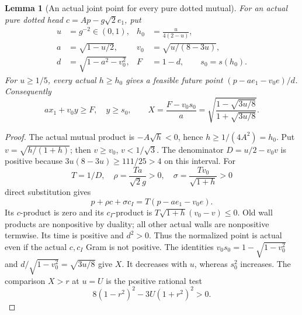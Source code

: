 \documentclass[11pt]{article}
\newtheorem{lemma}[theorem]{Lemma}
\theoremstyle{definition}
\theoremstyle{remark}
\begin{document}
\begin{lemma}[An actual joint point for every pure dotted mutual]
\label{lem:I-pure-dotted-joint-point}
For an actual pure dotted head \(c=Ap-g\sqrt2e_1\), put
\[
\begin{aligned}
 u&=g^{-2}\in(0,1),& h_0&=\frac{u}{4(2-u)},\\
 a&=\sqrt{1-u/2},& v_0&=\sqrt{u/(8-3u)},\\
 d&=\sqrt{1-a^2-v_0^2},& F&=1-d,\qquad s_0=s(h_0).
\end{aligned}
\]
For \(u\ge1/5\), every actual \(h\ge h_0\) gives a feasible
future point \((p-ae_1-v_0e)/d\). Consequently
\[
 a x_1+v_0y\ge F,\quad y\ge s_0,\qquad
 X={\frac{F-v_0s_0}{ a}}
 =\sqrt{{\frac{1-\sqrt{3u/8}}{1+\sqrt{3u/8}}}}.
\]
\end{lemma}
\begin{proof}
The actual mutual product is \(-A\sqrt h<0\), hence
\(h\ge1/(4A^2)=h_0\). Put \(v=\sqrt{h/(1+h)}\);
then \(v\ge v_0\), \(v<1/\sqrt3\).
The denominator \(D=u/2-v_0v\) is positive because
\(3u(8-3u)\ge111/25>4\) on this interval. For
\[
 T=1/D,\quad \rho={\frac{Ta}{\sqrt2g}}>0,\quad
 \sigma={\frac{Tv_0}{\sqrt{1+h}}}>0
\]
direct substitution gives
\[
 p+\rho c+\sigma c_I=T(p-ae_1-v_0e).
\]
Its \(c\)-product is zero and its \(c_I\)-product is
\(T\sqrt{1+h}(v_0-v)\le0\). Old wall products are nonpositive
by duality; all other actual walls are nonpositive termwise.
Its time is positive and \(d^2>0\). Thus the normalized point is
actual even if the actual \(c,c_I\) Gram is not positive.
The identities \(v_0s_0=1-\sqrt{1-v_0^2}\) and
\(d/\sqrt{1-v_0^2}=\sqrt{3u/8}\) give \(X\).
It decreases with \(u\), whereas \(s_0^2\) increases.
The comparison \(X>r\) at \(u=U\) is the positive rational test
\[
 8(1-r^2)^2-3U(1+r^2)^2>0.
\]
\end{proof}
\end{document}

